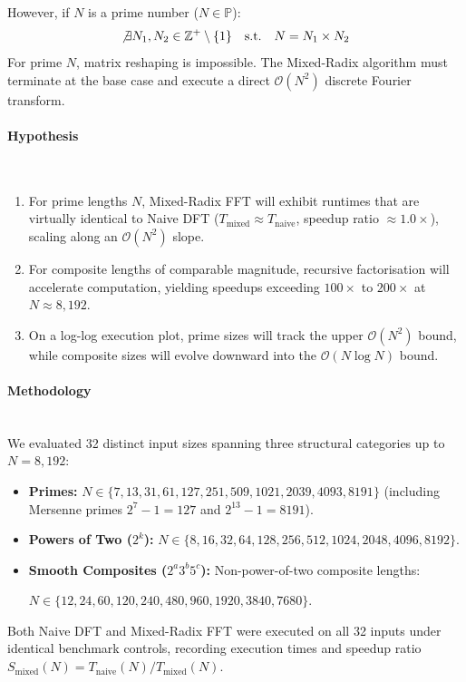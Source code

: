 \documentclass{article}
\begin{document}
However, if $N$ is a prime number ($N \in \mathbb{P}$):
\begin{equation}
\not\exists N_1, N_2 \in \mathbb{Z}^+ \setminus \{1\} \quad \text{s.t.} \quad N = N_1 \times N_2
\end{equation}
For prime $N$, matrix reshaping is impossible. The Mixed-Radix algorithm must terminate at the base case and execute a direct $\mathcal{O}(N^2)$ discrete Fourier transform.


\paragraph{Hypothesis}~{}\\
\begin{enumerate}
    \item For prime lengths $N$, Mixed-Radix FFT will exhibit runtimes that are virtually identical to Naive DFT ($T_{\text{mixed}} \approx T_{\text{naive}}$, speedup ratio $\approx 1.0\times$), scaling along an $\mathcal{O}(N^2)$ slope.
    \item For composite lengths of comparable magnitude, recursive factorisation will accelerate computation, yielding speedups exceeding $100\times$ to $200\times$ at $N \approx 8,192$.
    \item On a log-log execution plot, prime sizes will track the upper $\mathcal{O}(N^2)$ bound, while composite sizes will evolve downward into the $\mathcal{O}(N \log N)$ bound.
\end{enumerate}

\paragraph{Methodology}~{}\\
We evaluated 32 distinct input sizes spanning three structural categories up to $N = 8,192$:
\begin{itemize}
    \item \textbf{Primes:} $N \in \{7, 13, 31, 61, 127, 251, 509, 1021, 2039, 4093, 8191\}$ (including Mersenne primes $2^7-1 = 127$ and $2^{13}-1 = 8191$).
    \item \textbf{Powers of Two ($2^k$):} $N \in \{8, 16, 32, 64, 128, 256, 512, 1024, 2048, 4096, 8192\}$.
    \item \textbf{Smooth Composites ($2^a 3^b 5^c$):} Non-power-of-two composite lengths:
    \begin{center}
    $N \in \{12, 24, 60, 120, 240, 480, 960, 1920, 3840, 7680\}$.
    \end{center}
\end{itemize}
Both Naive DFT and Mixed-Radix FFT were executed on all 32 inputs under identical benchmark controls, recording execution times and speedup ratio $S_{\text{mixed}}(N) = T_{\text{naive}}(N) / T_{\text{mixed}}(N)$.
\end{document}
